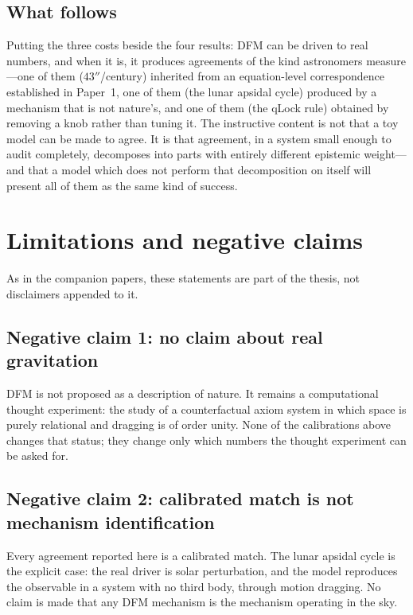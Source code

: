 \documentclass[aps,reprint,amsmath,amssymb,nofootinbib,superscriptaddress,floatfix]{revtex4-2}
\begin{document}
\subsection{What follows}
\label{sec:follows}

Putting the three costs beside the four results: DFM can be driven to
real numbers, and when it is, it produces agreements of the kind
astronomers measure---one of them ($43''$/century) inherited from an
equation-level correspondence established in Paper~1, one of them (the
lunar apsidal cycle) produced by a mechanism that is not nature's, and
one of them (the qLock rule) obtained by removing a knob rather than
tuning it.
The instructive content is not that a toy model can be made to agree.
It is that agreement, in a system small enough to audit completely,
decomposes into parts with entirely different epistemic weight---and
that a model which does not perform that decomposition on itself will
present all of them as the same kind of success.

\section{Limitations and negative claims}
\label{sec:negative}

As in the companion papers, these statements are part of the thesis,
not disclaimers appended to it.

\subsection{Negative claim 1: no claim about real gravitation}
DFM is not proposed as a description of nature.
It remains a computational thought experiment: the study of a
counterfactual axiom system in which space is purely relational and
dragging is of order unity.
None of the calibrations above changes that status; they change only
which numbers the thought experiment can be asked for.

\subsection{Negative claim 2: calibrated match is not mechanism
  identification}
Every agreement reported here is a calibrated match.
The lunar apsidal cycle is the explicit case: the real driver is solar
perturbation, and the model reproduces the observable in a system with
no third body, through motion dragging.
No claim is made that any DFM mechanism is the mechanism operating in
the sky.
\end{document}
